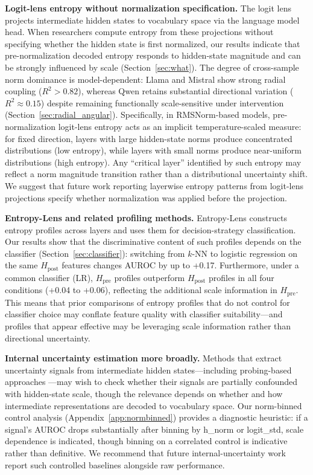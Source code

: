 \documentclass{ieeeaccess}
\newcommand{\Hpre}{H_{\text{pre}}}
\newcommand{\Hpost}{H_{\text{post}}}
\begin{document}
\textbf{Logit-lens entropy without normalization specification.} The logit lens \cite{nostalgebraist2020logitlens} projects intermediate hidden states to vocabulary space via the language model head. When researchers compute entropy from these projections without specifying whether the hidden state is first normalized, our results indicate that pre-normalization decoded entropy responds to hidden-state magnitude and can be strongly influenced by scale (Section~\ref{sec:what}). The degree of cross-sample norm dominance is model-dependent: Llama and Mistral show strong radial coupling ($R^2 > 0.82$), whereas Qwen retains substantial directional variation ($R^2 \approx 0.15$) despite remaining functionally scale-sensitive under intervention (Section~\ref{sec:radial_angular}). Specifically, in RMSNorm-based models, pre-normalization logit-lens entropy acts as an implicit temperature-scaled measure: for fixed direction, layers with large hidden-state norms produce concentrated distributions (low entropy), while layers with small norms produce near-uniform distributions (high entropy). Any ``critical layer'' identified by such entropy may reflect a norm magnitude transition rather than a distributional uncertainty shift. We suggest that future work reporting layerwise entropy patterns from logit-lens projections specify whether normalization was applied before the projection.

\textbf{Entropy-Lens and related profiling methods.} Entropy-Lens \cite{ali2025entropylens} constructs entropy profiles across layers and uses them for decision-strategy classification. Our results show that the discriminative content of such profiles depends on the classifier (Section~\ref{sec:classifier}): switching from $k$-NN to logistic regression on the same $\Hpost$ features changes AUROC by up to +0.17. Furthermore, under a common classifier (LR), $\Hpre$ profiles outperform $\Hpost$ profiles in all four conditions (+0.04 to +0.06), reflecting the additional scale information in $\Hpre$. This means that prior comparisons of entropy profiles that do not control for classifier choice may conflate feature quality with classifier suitability---and profiles that appear effective may be leveraging scale information rather than directional uncertainty.

\textbf{Internal uncertainty estimation more broadly.} Methods that extract uncertainty signals from intermediate hidden states---including probing-based approaches \cite{kossen2024seps, bhatnagar2026drift}---may wish to check whether their signals are partially confounded with hidden-state scale, though the relevance depends on whether and how intermediate representations are decoded to vocabulary space. Our norm-binned control analysis (Appendix~\ref{app:normbinned}) provides a diagnostic heuristic: if a signal's AUROC drops substantially after binning by h\_norm or logit\_std, scale dependence is indicated, though binning on a correlated control is indicative rather than definitive. We recommend that future internal-uncertainty work report such controlled baselines alongside raw performance.
\end{document}
